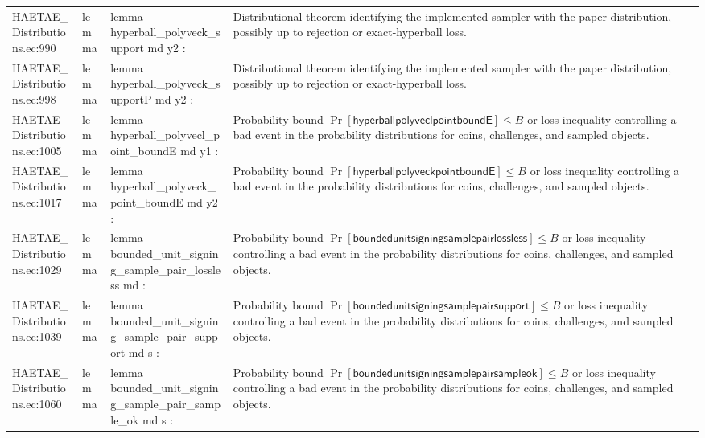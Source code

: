 \documentclass[10pt]{article}
\begin{document}
\begin{longtable}{L{0.11\textwidth}L{0.055\textwidth}L{0.385\textwidth}L{0.41\textwidth}}
HAETAE\_\allowbreak{}Distributions.\allowbreak{}ec:\allowbreak{}990 & lemma & {\ttfamily\scriptsize lemma hyperball\_\allowbreak{}polyveck\_\allowbreak{}support md y2 :} & Distributional theorem identifying the implemented sampler with the paper distribution, possibly up to rejection or exact-hyperball loss. \\
HAETAE\_\allowbreak{}Distributions.\allowbreak{}ec:\allowbreak{}998 & lemma & {\ttfamily\scriptsize lemma hyperball\_\allowbreak{}polyveck\_\allowbreak{}supportP md y2 :} & Distributional theorem identifying the implemented sampler with the paper distribution, possibly up to rejection or exact-hyperball loss. \\
HAETAE\_\allowbreak{}Distributions.\allowbreak{}ec:\allowbreak{}1005 & lemma & {\ttfamily\scriptsize lemma hyperball\_\allowbreak{}polyvecl\_\allowbreak{}point\_\allowbreak{}boundE md y1 :} & Probability bound $\Pr[\mathsf{hyperballpolyveclpointboundE}]\le B$ or loss inequality controlling a bad event in the probability distributions for coins, challenges, and sampled objects. \\
HAETAE\_\allowbreak{}Distributions.\allowbreak{}ec:\allowbreak{}1017 & lemma & {\ttfamily\scriptsize lemma hyperball\_\allowbreak{}polyveck\_\allowbreak{}point\_\allowbreak{}boundE md y2 :} & Probability bound $\Pr[\mathsf{hyperballpolyveckpointboundE}]\le B$ or loss inequality controlling a bad event in the probability distributions for coins, challenges, and sampled objects. \\
HAETAE\_\allowbreak{}Distributions.\allowbreak{}ec:\allowbreak{}1029 & lemma & {\ttfamily\scriptsize lemma bounded\_\allowbreak{}unit\_\allowbreak{}signing\_\allowbreak{}sample\_\allowbreak{}pair\_\allowbreak{}lossless md :} & Probability bound $\Pr[\mathsf{boundedunitsigningsamplepairlossless}]\le B$ or loss inequality controlling a bad event in the probability distributions for coins, challenges, and sampled objects. \\
HAETAE\_\allowbreak{}Distributions.\allowbreak{}ec:\allowbreak{}1039 & lemma & {\ttfamily\scriptsize lemma bounded\_\allowbreak{}unit\_\allowbreak{}signing\_\allowbreak{}sample\_\allowbreak{}pair\_\allowbreak{}support md s :} & Probability bound $\Pr[\mathsf{boundedunitsigningsamplepairsupport}]\le B$ or loss inequality controlling a bad event in the probability distributions for coins, challenges, and sampled objects. \\
HAETAE\_\allowbreak{}Distributions.\allowbreak{}ec:\allowbreak{}1060 & lemma & {\ttfamily\scriptsize lemma bounded\_\allowbreak{}unit\_\allowbreak{}signing\_\allowbreak{}sample\_\allowbreak{}pair\_\allowbreak{}sample\_\allowbreak{}ok md s :} & Probability bound $\Pr[\mathsf{boundedunitsigningsamplepairsampleok}]\le B$ or loss inequality controlling a bad event in the probability distributions for coins, challenges, and sampled objects. \\

\end{longtable}
\end{document}
